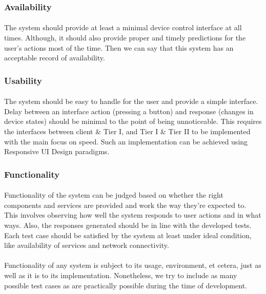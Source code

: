 \subsubsection*{Availability}
\paragraph{}
The system should provide at least a minimal device control interface at all times. Although, it should also provide proper and timely predictions for the user's actions most of the time. Then we can say that this system has an acceptable record of availability.

\subsubsection*{Usability}
\paragraph{}
The system should be easy to handle for the user and provide a simple interface. Delay between an interface action (pressing a button) and response (changes in device states) should be minimal to the point of being unnoticeable. This requires the interfaces between client \& Tier I, and Tier I \& Tier II to be implemented with the main focus on speed. Such an implementation can be achieved using Responsive UI Design paradigms.

\subsubsection*{Functionality}
\paragraph{}
Functionality of the system can be judged based on whether the right components and services are provided and work the way they're expected to. This involves observing how well the system responds to user actions and in what ways. Also, the responses generated should be in line with the developed tests. Each test case should be satisfied by the system at least under ideal condition, like availability of services and network connectivity.

\paragraph{}
Functionality of any system is subject to its usage, environment, et cetera, just as well as it is to its implementation. Nonetheless, we try to include as many possible test cases as are practically possible during the time of development.

